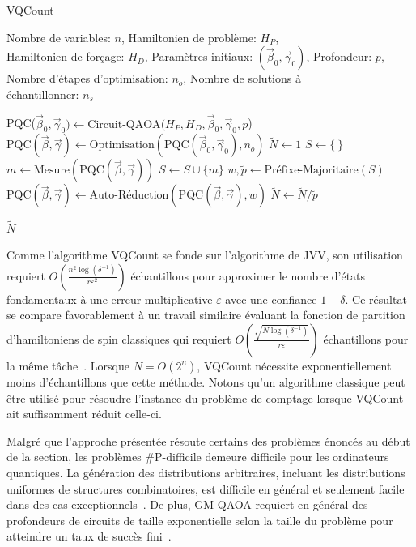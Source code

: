 \begin{algorithm}[h!]
    \caption{VQCount}\label{alg:vqcount}
    \begin{algorithmic}[1]
    \REQUIRE Nombre de variables: $n$, Hamiltonien de problème: $H_P$,\\Hamiltonien de forçage: $H_D$, Paramètres initiaux: $(\vec{\beta}_0, \vec{\gamma}_0)$, Profondeur: $p$, Nombre d'étapes d'optimisation: $n_{o}$, Nombre de solutions à\\échantillonner: $n_s$
    
    \STATE PQC($\vec{\beta}_0, \vec{\gamma}_0) \leftarrow \text{Circuit-QAOA}(H_P, H_D, \vec{\beta}_0, \vec{\gamma}_0, p$)
    \STATE $\text{PQC}(\vec{\beta}, \vec{\gamma}) \leftarrow \text{Optimisation}(\text{PQC}(\vec{\beta}_0, \vec{\gamma}_0), n_{o})$
    \STATE $\tilde{N} \leftarrow 1$
    \STATE $S \leftarrow \{ \ \}$
    \STATE $m \leftarrow \text{Mesure}(\text{PQC}(\vec{\beta}, \vec{\gamma}))$
    \STATE $S \leftarrow S \cup \{m\}$
    \ENDIF
    \ENDWHILE
    \STATE $w, \tilde{p} \leftarrow \text{Préfixe-Majoritaire}(S)$
    \STATE $\text{PQC}(\vec{\beta}, \vec{\gamma}) \leftarrow \text{Auto-Réduction}(\text{PQC}(\vec{\beta}, \vec{\gamma}), w)$
    \STATE $\tilde{N} \leftarrow \tilde{N} / \tilde{p}$
    \ENDFOR
    
    \RETURN $\tilde{N}$
\end{algorithmic}
\end{algorithm}
    
Comme l'algorithme VQCount se fonde sur l'algorithme de JVV, son utilisation requiert $O(\frac{n^{2} \log (\delta^{-1})}{r \varepsilon^{2}})$ échantillons pour approximer le nombre d'états fondamentaux à une erreur multiplicative $\varepsilon$ avec une confiance $1 - \delta$. Ce résultat se compare favorablement à un travail similaire évaluant la fonction de partition d'hamiltoniens de spin classiques qui requiert $O(\frac{\sqrt{N \log(\delta^{-1})}}{r \varepsilon})$ échantillons pour la même tâche~\cite{sundarQuantumAlgorithmCount2019}. Lorsque $N=O(2^{n})$, VQCount nécessite exponentiellement moins d'échantillons que cette méthode. Notons qu'un algorithme classique peut être utilisé pour résoudre l'instance du problème de comptage lorsque VQCount ait suffisamment réduit celle-ci.

Malgré que l'approche présentée résoute certains des problèmes énoncés au début de la section, les problèmes \textsf{\#P}-difficile demeure difficile pour les ordinateurs quantiques. La génération des distributions arbitraires, incluant les distributions uniformes de structures combinatoires, est difficile en général et seulement facile dans des cas exceptionnels~\cite{aaronsonComputationalComplexityLinear2011, boulandComplexityVerificationQuantum2019}. De plus, GM-QAOA requiert en général des profondeurs de circuits de taille exponentielle selon la taille du problème pour atteindre un taux de succès fini~\cite{xiePerformanceUpperBound2025}. 

